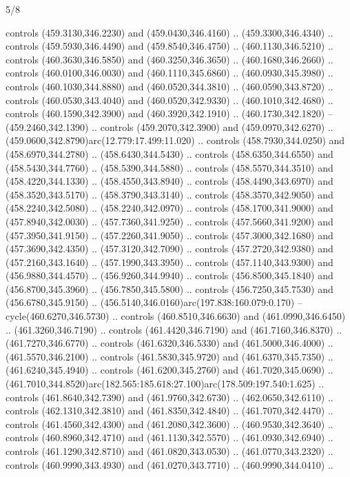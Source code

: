 \begin{flagdescription}{5/8}
\begin{scope}[xshift=0.5\flaglength,yshift=0.5\flagwidth,scale=\flagwidth/475.63]
\begin{scope}[y=0.8pt, x=0.8pt, yscale=-1, xscale=1,shift={(-450,-300)}]
\begin{scope}[cm={{1.0,0.0,0.0,1.0,(-0.0002,0.12556)}},cm={{1.0,0.0,0.0,1.0,(0.00179,0.0)}}]
\begin{scope}[cm={{1.01375,0.0,0.0,1.01375,(-5.36379,-4.94943)}}]
  controls (459.3130,346.2230) and (459.0430,346.4160) .. (459.3300,346.4340) ..
  controls (459.5930,346.4490) and (459.8540,346.4750) .. (460.1130,346.5210) ..
  controls (460.3630,346.5850) and (460.3250,346.3650) .. (460.1680,346.2660) ..
  controls (460.0100,346.0030) and (460.1110,345.6860) .. (460.0930,345.3980) ..
  controls (460.1030,344.8880) and (460.0520,344.3810) .. (460.0590,343.8720) ..
  controls (460.0530,343.4040) and (460.0520,342.9330) .. (460.1010,342.4680) ..
  controls (460.1590,342.3900) and (460.3920,342.1910) .. (460.1730,342.1820) --
  (459.2460,342.1390) .. controls (459.2070,342.3900) and (459.0970,342.6270) ..
  (459.0600,342.8790)arc(12.779:17.499:11.020) .. controls (458.7930,344.0250)
  and (458.6970,344.2780) .. (458.6430,344.5430) .. controls (458.6350,344.6550)
  and (458.5430,344.7760) .. (458.5390,344.5880) .. controls (458.5570,344.3510)
  and (458.4220,344.1330) .. (458.4550,343.8940) .. controls (458.4490,343.6970)
  and (458.3520,343.5170) .. (458.3790,343.3140) .. controls (458.3570,342.9050)
  and (458.2240,342.5080) .. (458.2240,342.0970) .. controls (458.1700,341.9000)
  and (457.8940,342.0030) .. (457.7360,341.9250) .. controls (457.5660,341.9200)
  and (457.3950,341.9150) .. (457.2260,341.9050) .. controls (457.3000,342.1680)
  and (457.3690,342.4350) .. (457.3120,342.7090) .. controls (457.2720,342.9380)
  and (457.2160,343.1640) .. (457.1990,343.3950) .. controls (457.1140,343.9300)
  and (456.9880,344.4570) .. (456.9260,344.9940) .. controls (456.8500,345.1840)
  and (456.8700,345.3960) .. (456.7850,345.5800) .. controls (456.7250,345.7530)
  and (456.6780,345.9150) .. (456.5140,346.0160)arc(197.838:160.079:0.170) --
  cycle(460.6270,346.5730) .. controls (460.8510,346.6630) and
  (461.0990,346.6450) .. (461.3260,346.7190) .. controls (461.4420,346.7190) and
  (461.7160,346.8370) .. (461.7270,346.6770) .. controls (461.6320,346.5330) and
  (461.5000,346.4000) .. (461.5570,346.2100) .. controls (461.5830,345.9720) and
  (461.6370,345.7350) .. (461.6240,345.4940) .. controls (461.6200,345.2760) and
  (461.7020,345.0690) ..
  (461.7010,344.8520)arc(182.565:185.618:27.100)arc(178.509:197.540:1.625) ..
  controls (461.8640,342.7390) and (461.9760,342.6730) .. (462.0650,342.6110) ..
  controls (462.1310,342.3810) and (461.8350,342.4840) .. (461.7070,342.4470) ..
  controls (461.4560,342.4300) and (461.2080,342.3600) .. (460.9530,342.3640) ..
  controls (460.8960,342.4710) and (461.1130,342.5570) .. (461.0930,342.6940) ..
  controls (461.1290,342.8710) and (461.0820,343.0530) .. (461.0770,343.2320) ..
  controls (460.9990,343.4930) and (461.0270,343.7710) .. (460.9990,344.0410) ..

\end{scope}
\end{scope}
\end{scope}
\end{scope}
\end{flagdescription}
